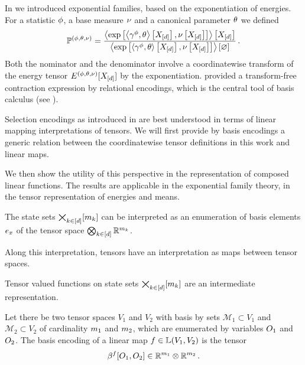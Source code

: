 \begin{example}
    In  we introduced exponential families, based on the exponentiation of energies.
    For a statistic $\phi$, a base measure $\nu$ and a canonical parameter $\theta$ we defined
    \begin{align*}
        \mathbb{P}^{(\phi,\theta,\nu)} = \frac{
            \left\langle \mathrm{exp}\left[\left\langle \gamma^{\phi},\theta\right\rangle \left[ X_{[d]} \right],\nu\left[X_{[d]}\right]\right]\right\rangle \left[ X_{[d]} \right]
        }{
            \left\langle \mathrm{exp}\left[\left\langle \gamma^{\phi},\theta\right\rangle \left[ X_{[d]} \right],\nu\left[X_{[d]}\right]\right]\right\rangle \left[ \varnothing \right]
        } \, .
    \end{align*}
    Both the nominator and the denominator involve a coordinatewise transform of the energy tensor $E^{(\phi,\theta,\nu)}[X_{[d]}]$ by the exponentiation.
     provided a transform-free contraction expression by relational encodings, which is the central tool of basis calculus (see ).
\end{example}




Selection encodings as introduced in  are best understood in terms of linear mapping interpretations of tensors.
We will first provide by basis encodings a generic relation between the coordinatewise tensor definitions in this work and linear maps.

We then show the utility of this perspective in the representation of composed linear functions.
The results are applicable in the exponential family theory, in the tensor representation of energies and means.


The state sets $\bigtimes_{k\in[d]}[m_{k}]$ can be interpreted as an enumeration of basis elements $e_{x}$ of the tensor space $\bigotimes_{k\in[d]} \mathbb{R}^{m_{k}}$.

Along this interpretation, tensors have an interpretation as maps between tensor spaces.


Tensor valued functions on state sets $\bigtimes_{k\in[d]}[m_{k}]$ are an intermediate representation.

\begin{definition}
    Let there be two tensor spaces $V_1$ and $V_2$ with basis by sets $\mathcal{M}_1\subset V_1$ and $\mathcal{M}_2\subset V_2$ of cardinality $m_{1}$ and $m_{2}$, which are enumerated by variables $O_{1}$ and $O_{2}$.
    The basis encoding of a linear map $f\in\mathbb{L}(V_1,V_2)$ is the tensor
    \[ \beta^{f}[O_{1},O_{2}] \in \mathbb{R}^{m_{1}} \otimes \mathbb{R}^{m_{2}} \, . \]
\end{definition}

